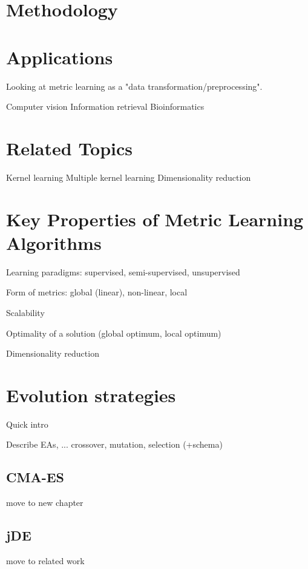 \documentclass[12pt,a4paper]{report}
\begin{document}

\section{Methodology}

\section{Applications}

Looking at metric learning as a "data transformation/preprocessing".

Computer vision
Information retrieval
Bioinformatics

\section{Related Topics}

Kernel learning
Multiple kernel learning
Dimensionality reduction

\section{Key Properties of Metric Learning Algorithms}

Learning paradigms: supervised, semi-supervised, unsupervised

Form of metrics: global (linear), non-linear, local

Scalability

Optimality of a solution (global optimum, local optimum)

Dimensionality reduction


\section{Evolution strategies} \label{chap:ea}
Quick intro

Describe EAs, ... crossover, mutation, selection (+schema)

\subsection{CMA-ES} \label{chap:ea:cmaes}
move to new chapter
\subsection{jDE} \label{chap:ea:jde}
move to related work
\end{document}
